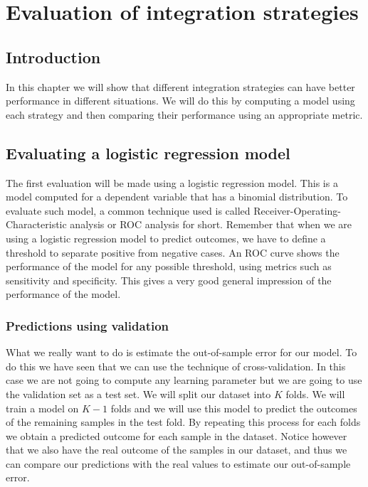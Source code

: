 \chapter{Evaluation of integration strategies}
\label{cha:evaluation}


\section{Introduction}
\label{sec:evaluation-introduction}
In this chapter we will show that different integration strategies can have better performance in different situations. We will do this by computing a model using each strategy and then comparing their performance using an appropriate metric.
\section{Evaluating a logistic regression model}
\label{sec:evaluation-logisticregression}
The first evaluation will be made using a logistic regression model. This is a model computed for a dependent variable that has a binomial distribution. To evaluate such model, a common technique used is called Receiver-Operating-Characteristic analysis\cite{zweig1993receiver}\cite{hajian2013receiver}\cite{wikiroc} or ROC analysis for short. Remember that when we are using a logistic regression model to predict outcomes, we have to define a threshold to separate positive from negative cases. An ROC curve shows the performance of the model for any possible threshold, using metrics such as sensitivity and specificity. This gives a very good general impression of the performance of the model.
\subsection{Predictions using validation}
What we really want to do is estimate the out-of-sample error for our model. To do this we have seen that we can use the technique of cross-validation. In this case we are not going to compute any learning parameter but we are going to use the validation set as a test set. We will split our dataset into $K$ folds. We will train a model on $K-1$ folds and we will use this model to predict the outcomes of the remaining samples in the test fold. By repeating this process for each folds we obtain a predicted outcome for each sample in the dataset. Notice however that we also have the real outcome of the samples in our dataset, and thus we can compare our predictions with the real values to estimate our out-of-sample error.

